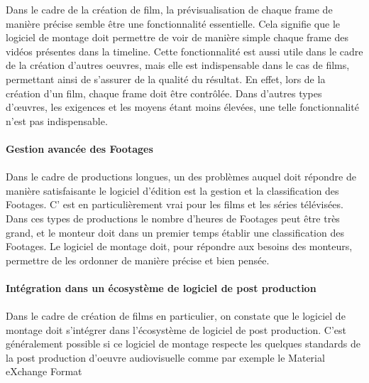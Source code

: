Dans le cadre de la création de film, la prévisualisation de
chaque frame de manière précise semble être une fonctionnalité
essentielle. Cela signifie que le logiciel de montage doit permettre
de voir de manière simple chaque frame des vidéos présentes dans
la timeline. Cette fonctionnalité est aussi utile dans le cadre de la
création d'autres oeuvres, mais elle est indispensable dans le cas de
films, permettant ainsi de s'assurer de la qualité du résultat. En
effet, lors de la création d'un film, chaque frame doit être
contrôlée.  Dans d'autres types d'œuvres, les exigences et les moyens
étant moins élevées, une telle fonctionnalité n'est pas indispensable.

\paragraph{Gestion avancée des Footages}

\paragraph{}

Dans le cadre de productions longues, un des problèmes auquel doit
répondre de manière satisfaisante le logiciel d'édition est la gestion
et la classification des Footages. C' est en particulièrement vrai pour
les films et les séries télévisées.  Dans ces types de productions
le nombre d'heures de Footages peut être très grand, et le monteur
doit dans un premier temps établir une classification des Footages. Le
logiciel de montage doit, pour répondre aux besoins des monteurs,
permettre de les ordonner de manière précise et bien pensée.

\paragraph{Intégration dans un écosystème de logiciel de post
production}

\paragraph{}

Dans le cadre de création de films en particulier, on constate que le
logiciel de montage doit s'intégrer dans l'écosystème de logiciel
de post production. C'est généralement possible si ce logiciel
de montage respecte les quelques standards de la post production
d'oeuvre audiovisuelle comme par exemple le Material eXchange Format
 

